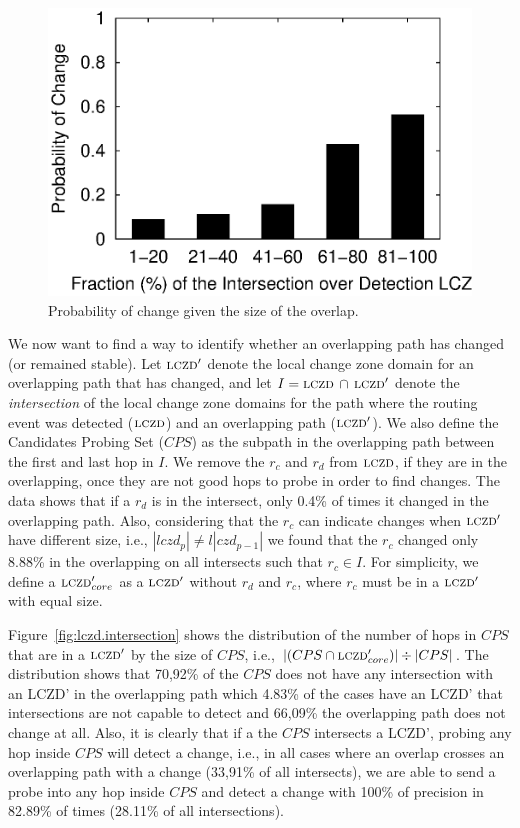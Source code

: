 \begin{figure}
\begin{center}
\includegraphics[width=0.8\columnwidth]{figs/patching/probchange/probchange.eps}
\caption{Probability of change given the size of the overlap. }
\label{fig:overlap.change.prob}
\end{center}
%
\end{figure}
%

We now want to find a way to identify whether an overlapping path
has changed (or remained stable).  Let $\mathrm{\textsc{lczd}}'$ denote the local
change zone domain for an overlapping path that has changed, and let
$I = \mathrm{\textsc{lczd}}\,\cap\,\mathrm{\textsc{lczd}}'$ denote the \emph{intersection} of the
local change zone domains for the path where the routing event was
detected ($\mathrm{\textsc{lczd}}$) and an overlapping path ($\mathrm{\textsc{lczd}}'$).
We also define the Candidates Probing Set ($CPS$) as the subpath 
in the overlapping path between the first and last hop in $I$.
We remove the $r_c$ and $r_d$ from $\mathrm{\textsc{lczd}}$, if they are in the overlapping,
once they are not good hops to probe in order to find changes.
The data shows that if a $r_d$ is in the intersect, only 0.4\% of times
it changed in the overlapping path. Also, considering that the $r_c$ can
indicate changes when $\mathrm{\textsc{lczd}}'$ have different size, i.e., $|lczd_{p}| \ne l|czd_{p-1}|$ 
we found that the $r_c$ changed only 8.88\% in the overlapping on all intersects such that 
$r_c \in I$. For simplicity, we define a $\mathrm{\textsc{lczd}}'_{core}$ as a $\mathrm{\textsc{lczd}}'$ without
$r_d$ and $r_c$, where $r_c$ must be in a $\mathrm{\textsc{lczd}}'$ with equal size.


Figure~\ref{fig:lczd.intersection} shows the distribution of the
number of hops in $CPS$ that are in a $\mathrm{\textsc{lczd}}'$ by the
size of $CPS$,
i.e., $|(CPS \cap \mathrm{\textsc{lczd}}'_{core})| \div |CPS|$.  The distribution shows that 
70,92\% of the $CPS$ does not have any intersection with 
an LCZD' in the overlapping path which 4.83\% of the cases
have an LCZD' that intersections are not capable to detect and 66,09\%
the overlapping path does not change at all. Also, it is clearly that if a 
the $CPS$ intersects a LCZD', probing any hop inside $CPS$ will detect
a change, i.e., in all cases where an overlap crosses an overlapping path
with a change (33,91\% of all intersects), we are able to send a probe into any hop inside
$CPS$ and detect a change with 100\% of precision in 82.89\% of times (28.11\% of all intersections).

